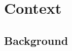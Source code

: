 \documentclass{report}
\begin{document}


\chapter{Context} \label{Context} %








\section{Background} \label{Background}  %
\end{document}
